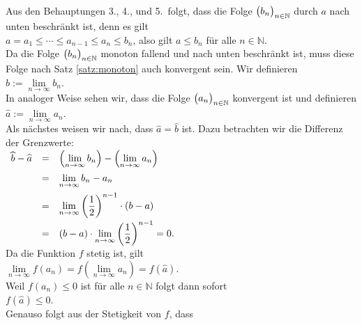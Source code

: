 Aus den Behauptungen 3., 4., und 5.~folgt, dass die Folge $\bigl(b_n\bigr)_{n\in\mathbb{N}}$ durch $a$ nach unten
beschr\"ankt ist, denn es gilt
\\[0.2cm]
\hspace*{1.3cm} $a = a_1 \leq \cdots \leq a_{n-1} \leq a_n \leq b_n$, \quad
                also gilt $a \leq b_n$ f\"ur alle $n\in\mathbb{N}$.
 \\[0.2cm]
Da die Folge $\bigl(b_n\bigr)_{n\in\mathbb{N}}$ monoton fallend und nach unten beschr\"ankt ist, muss diese Folge
nach Satz \ref{satz:monoton} auch konvergent sein.  Wir definieren
\\[0.2cm]
\hspace*{1.3cm}
$\widehat{b} := \lim\limits_{n\rightarrow\infty} b_n$.
\\[0.2cm]
In analoger Weise sehen wir, dass die Folge $\bigl(a_n\bigr)_{n\in\mathbb{N}}$ konvergent ist und definieren
\\[0.2cm]
\hspace*{1.3cm}
$\widehat{a} := \lim\limits_{n\rightarrow\infty} a_n$.
\\[0.2cm]
Als n\"achstes weisen wir nach, dass $\widehat{a} = \widehat{b}$ ist.  Dazu betrachten wir
die Differenz der Grenzwerte: 
\\[0.2cm]
\hspace*{1.3cm}
$
\begin{array}[t]{lcl}  
\widehat{b} - \widehat{a} & = &
 \displaystyle\left(\lim\limits_{n\rightarrow\infty} b_n\right) - \left(\lim\limits_{n\rightarrow\infty} a_n\right) \\[0.3cm]
& = & \displaystyle\lim\limits_{n\rightarrow\infty} b_n - a_n \\[0.3cm]
& = & \displaystyle\lim\limits_{n\rightarrow\infty} \left(\frac{1}{2}\right)^{n-1} \cdot (b-a) \\[0.3cm]
& = & \displaystyle (b-a) \cdot \lim\limits_{n\rightarrow\infty} \left(\frac{1}{2}\right)^{n-1} = 0.
\end{array}
$
\\[0.2cm]
Da die Funktion $f$ stetig ist, gilt
\\[0.2cm]
\hspace*{1.3cm}
$\lim\limits_{n\rightarrow\infty} f(a_n) = f\left(\lim\limits_{n\rightarrow\infty} a_n\right) = f(\widehat{a})$.
\\[0.31cm]
Weil $f(a_n) \leq 0$ ist f\"ur alle $n\in\mathbb{N}$ folgt dann sofort
\\[0.2cm]
\hspace*{1.3cm}
$f(\widehat{a}) \leq 0$.
\\[0.2cm]
Genauso folgt aus der Stetigkeit von $f$, dass
\\[0.2cm]
